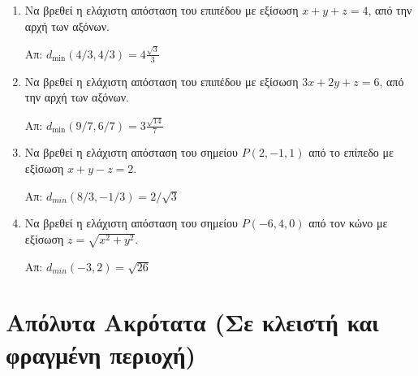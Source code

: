 \begin{enumerate}
  \item Να βρεθεί η ελάχιστη απόσταση του επιπέδου με εξίσωση $ x+y+z=4 $, από την 
    αρχή των αξόνων.

    \hfill Απ: $ d_{\min}(4/3,4/3) = 4\frac{\sqrt{3}}{3} $  

  \item Να βρεθεί η ελάχιστη απόσταση του επιπέδου με εξίσωση $ 3x+2y+z=6 $, από την 
    αρχή των αξόνων.

    \hfill Απ: $ d_{\min}(9/7,6/7) = 3\frac{\sqrt{14}}{7} $  

  \item Να βρεθεί η ελάχιστη απόσταση του σημείου $ P(2,-1,1) $ από το επίπεδο με 
    εξίσωση $ x+y-z=2 $. 
    
    \hfill Απ: $ d_{min}(8/3,-1/3) = 2 /\sqrt{3} $ 

  \item Να βρεθεί η ελάχιστη απόσταση του σημείου $ P(-6,4,0) $ από τον κώνο με 
    εξίσωση $ z = \sqrt{x^{2}+y^{2}} $. 
    
    \hfill Απ: $ d_{min}(-3,2) = \sqrt{26} $ 

\end{enumerate}


\section*{Απόλυτα Ακρότατα (Σε κλειστή και φραγμένη περιοχή)}

